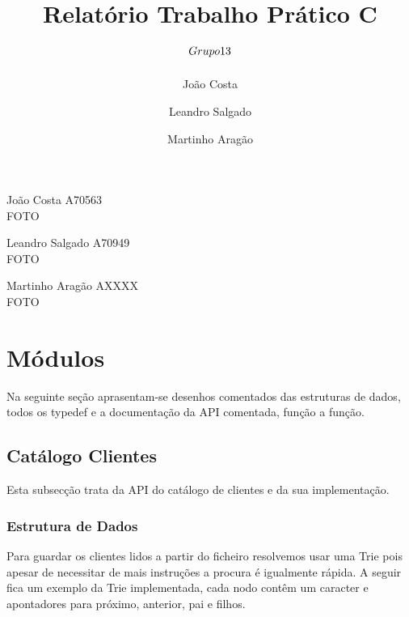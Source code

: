 \documentclass[10pt] {article}
\begin{document}
\title{Relatório Trabalho Prático C \\ $\small{Grupo 13}$}
\author{João Costa \and Leandro Salgado \and Martinho Aragão}

\maketitle


\begin{flushleft}
João Costa A70563 \\
FOTO
\end{flushleft}

\begin{flushleft}
Leandro Salgado A70949 \\
FOTO
\end{flushleft}

\begin{flushleft}
Martinho Aragão AXXXX \\
FOTO
\end{flushleft}

\newpage

\tableofcontents

\newpage

\section{Módulos}
Na seguinte seção aprasentam-se desenhos comentados das estruturas de dados,
todos os typedef e a documentação da API comentada, função a função.


\subsection{Catálogo Clientes}
\par Esta subsecção trata da API do catálogo de clientes e da sua implementação.

\subsubsection{Estrutura de Dados}
\par
Para guardar os clientes lidos a partir do ficheiro resolvemos usar uma Trie pois apesar de
necessitar de mais instruções a procura é igualmente rápida. A seguir fica um exemplo da Trie implementada, 
cada nodo contêm um caracter e apontadores para próximo, anterior, pai e filhos.
\end{document}
